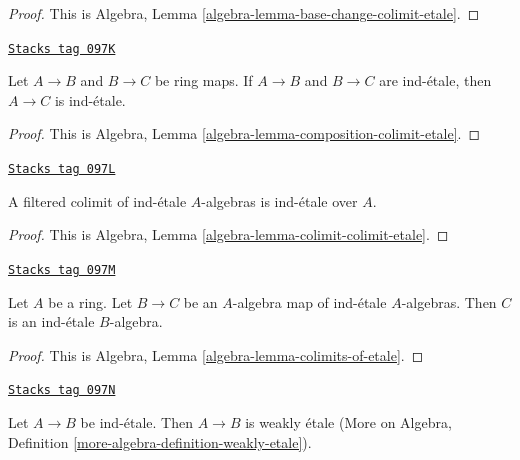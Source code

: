 \begin{proof}
This is Algebra, Lemma \ref{algebra-lemma-base-change-colimit-etale}.
\end{proof}

\begin{lemma}
\label{proetale-lemma-composition-ind-etale}
\href{https://stacks.math.columbia.edu/tag/097K}{\texttt{Stacks tag 097K}}

Let $A \to B$ and $B \to C$ be ring maps. If $A \to B$ and $B \to C$
are ind-\'etale, then $A \to C$ is ind-\'etale.
\end{lemma}

\begin{proof}
This is Algebra, Lemma \ref{algebra-lemma-composition-colimit-etale}.
\end{proof}

\begin{lemma}
\label{proetale-lemma-ind-ind-etale}
\href{https://stacks.math.columbia.edu/tag/097L}{\texttt{Stacks tag 097L}}

A filtered colimit of ind-\'etale $A$-algebras is ind-\'etale over $A$.
\end{lemma}

\begin{proof}
This is Algebra, Lemma \ref{algebra-lemma-colimit-colimit-etale}.
\end{proof}

\begin{lemma}
\label{proetale-lemma-ind-etale-permanence}
\href{https://stacks.math.columbia.edu/tag/097M}{\texttt{Stacks tag 097M}}

Let $A$ be a ring. Let $B \to C$ be an $A$-algebra map of ind-\'etale
$A$-algebras. Then $C$ is an ind-\'etale $B$-algebra.
\end{lemma}

\begin{proof}
This is Algebra, Lemma \ref{algebra-lemma-colimits-of-etale}.
\end{proof}

\begin{lemma}
\label{proetale-lemma-ind-etale-implies}
\href{https://stacks.math.columbia.edu/tag/097N}{\texttt{Stacks tag 097N}}

Let $A \to B$ be ind-\'etale. Then $A \to B$ is weakly \'etale
(More on Algebra, Definition \ref{more-algebra-definition-weakly-etale}).
\end{lemma}

